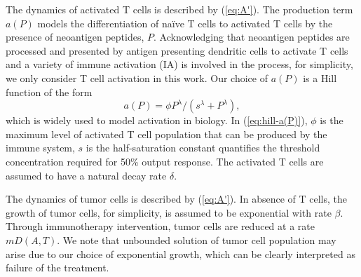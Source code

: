 \documentclass[review,authoryear]{elsarticle}
\begin{document}
The dynamics of activated T cells is described by (\ref{eq:A'}). The production term $a(P)$ models the differentiation of na\"ive T cells to activated T cells by the presence of neoantigen peptides, $P$. Acknowledging that neoantigen peptides are processed and presented by antigen presenting dendritic cells to activate T cells and a variety of immune activation (IA) is involved in the process, for simplicity, we only consider T cell activation in this work. Our choice of $a(P)$ is a Hill function of the form   
\begin{equation} \label{eq:hill-a(P)}
a(P)=\phi P^{\lambda}/(s^{\lambda}+P^{\lambda}), 
\end{equation}
which is widely used to model activation in biology\citep{Somvanshi2013}. In (\ref{eq:hill-a(P)}), $\phi$ is the maximum level of activated T cell population that can be produced by the immune system, $s$ is the half-saturation constant quantifies the threshold concentration required for 50\% output response. The activated T cells are assumed to have a natural decay rate $\delta$.

The dynamics of tumor cells is described by (\ref{eq:A'}). In absence of T cells, the growth of tumor cells, for simplicity, is assumed to be exponential with rate $\beta$. Through immunotherapy intervention, tumor cells are reduced at a rate $mD(A,T)$. We note that unbounded solution of tumor cell population may arise due to our choice of exponential growth, which can be clearly interpreted as failure of the treatment. 
\end{document}
